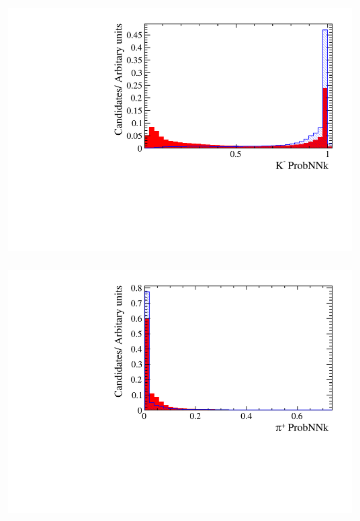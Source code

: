 \begin{figure}[!h]
\begin{subfigure}[t]{0.22\textwidth}
   \end{subfigure}
   \begin{subfigure}[t]{0.22\textwidth}
      \centering
      \includegraphics[width=1.0\textwidth]{figs/Selection/Ds_BDT_Var_Ds2KKPi_D_K1_MC15TuneV1_ProbNNk.pdf}
   \end{subfigure}
   \begin{subfigure}[t]{0.22\textwidth}
      \centering
      \includegraphics[width=1.0\textwidth]{figs/Selection/Ds_BDT_Var_Ds2KKPi_D_P_MC15TuneV1_ProbNNk.pdf}
   \end{subfigure}
   \begin{subfigure}[t]{0.22\textwidth}
      \centering

\end{subfigure}
\end{figure}
